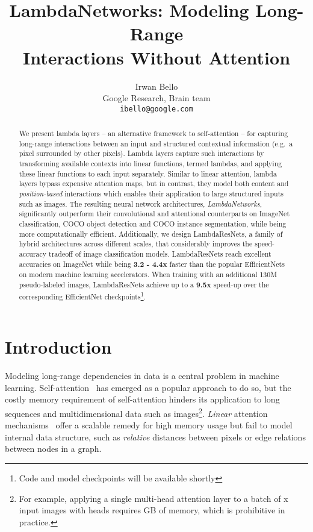 \documentclass{article} \usepackage{iclr2021_conference,times}
\title{LambdaNetworks: Modeling Long-Range \\
Interactions Without Attention}
\author{
    Irwan Bello \\
    Google Research, Brain team \\
    \texttt{ibello@google.com} \\
}
\begin{document}
\maketitle

\begin{abstract}
We present lambda layers -- an alternative framework to self-attention -- for capturing long-range interactions between an input and structured contextual information (e.g.\ a pixel surrounded by other pixels).
Lambda layers capture such interactions by transforming available contexts into linear functions, termed lambdas, and applying these linear functions to each input separately.
Similar to linear attention, lambda layers bypass expensive attention maps, but in contrast, they model both content and \emph{position-based} interactions which enables their application to large structured inputs such as images.
The resulting neural network architectures, \emph{LambdaNetworks}, significantly outperform their convolutional and attentional counterparts on ImageNet classification, COCO object detection and COCO instance segmentation, while being more computationally efficient.
Additionally, we design LambdaResNets, a family of hybrid architectures across different scales, that considerably improves the speed-accuracy tradeoff of image classification models.
LambdaResNets reach excellent accuracies on ImageNet while being \textbf{3.2 - 4.4x} faster than the popular EfficientNets on modern machine learning accelerators.
When training with an additional 130M pseudo-labeled images, LambdaResNets achieve up to a \textbf{9.5x} speed-up over the corresponding EfficientNet checkpoints\footnote{Code and model checkpoints will be available shortly}.
\end{abstract}
 \newpage
\tableofcontents
\newpage
\section{Introduction \label{sec:intro}}
Modeling long-range dependencies in data is a central problem in machine learning.
Self-attention~\citep{bahdanau2014neural,vaswani2017attention} has emerged as a popular approach to do so, 
but the costly memory requirement of self-attention hinders its application to long sequences and multidimensional data such as images\footnote{For example, applying a single multi-head attention layer to a batch of  x input images with  heads requires GB of memory, which is prohibitive in practice.
}.
\emph{Linear} attention mechanisms~\citep{katharopoulos2020transformers,choromanski2020rethinking} offer a scalable remedy for high memory usage but fail to model internal data structure, such as \emph{relative} distances between pixels or edge relations between nodes in a graph.
\end{document}
